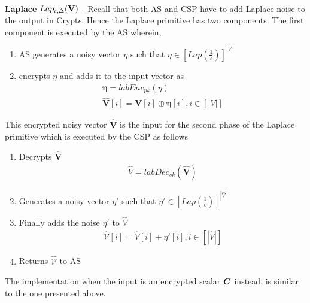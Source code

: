 \\ \textbf{\textsf{Laplace }}$Lap_{\epsilon,\Delta}(\mathbf{V})$ - Recall that both \textsf{AS} and \textsf{CSP} have to add Laplace noise to the output in Crypt$\epsilon$. Hence the \textsf{Laplace} primitive has two components. The first component is executed by the \textsf{AS} wherein,
\begin{enumerate} \item \textsf{AS} generates a noisy vector $\eta$ such that $\eta \in [Lap(\frac{1}{\epsilon})]^{|V|}$ \item encrypts $\eta$ and adds it to the input vector as \begin{gather*}\boldsymbol{\eta}=labEnc_{pk}(\eta)\\\mathbf{\hat{V}}[i]=\mathbf{V}[i]\oplus \boldsymbol{\eta}[i], i \in [|V|]\end{gather*} \end{enumerate} This encrypted noisy vector $\mathbf{\hat{V}}$ is the input for the second phase of the \textsf{Laplace} primitive which is executed by the \textsf{CSP} as follows \begin{enumerate}\item Decrypts $\mathbf{\hat{V}}$ \begin{gather*}\hat{V}=labDec_{sk}(\mathbf{\hat{V}})\end{gather*}  \item Generates a noisy vector $\eta'$ such that $\eta' \in [Lap(\frac{1}{\epsilon})]^{|\hat{V}|}$ \item Finally adds the noise $\eta'$ to $\hat{V}$ \begin{gather*}\hat{\mathcal{V}}[i]=\hat{V}[i]+\eta'[i], i \in [|\hat{V}|]\end{gather*} \item Returns $\hat{\mathcal{V}}$ to \textsf{AS} \end{enumerate} The implementation when the input is an encrypted scalar $\boldsymbol{C}$ instead, is similar to the one presented above.

